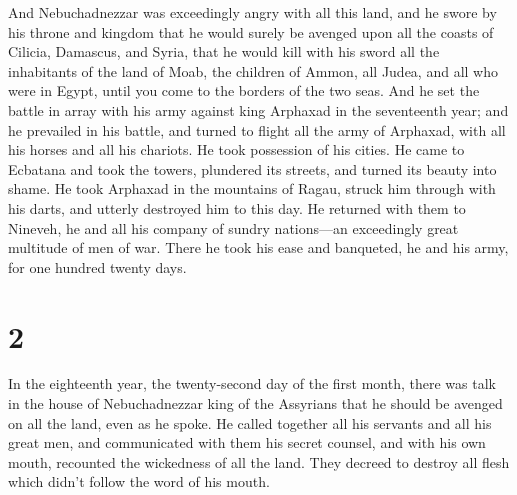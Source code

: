  And Nebuchadnezzar was exceedingly angry with all this
land, and he swore by his throne and kingdom that he would surely be
avenged upon all the coasts of Cilicia, Damascus, and Syria, that he
would kill with his sword all the inhabitants of the land of Moab, the
children of Ammon, all Judea, and all who were in Egypt, until you come
to the borders of the two seas.  And he set the battle in
array with his army against king Arphaxad in the seventeenth year; and
he prevailed in his battle, and turned to flight all the army of
Arphaxad, with all his horses and all his chariots.  He
took possession of his cities. He came to Ecbatana and took the towers,
plundered its streets, and turned its beauty into shame. 
He took Arphaxad in the mountains of Ragau, struck him through with his
darts, and utterly destroyed him to this day.  He
returned with them to Nineveh, he and all his company of sundry
nations---an exceedingly great multitude of men of war. There he took
his ease and banqueted, he and his army, for one hundred twenty days.

\hypertarget{section-1}{%
\section{2}\label{section-1}}

 In the eighteenth year, the twenty-second day of the
first month, there was talk in the house of Nebuchadnezzar king of the
Assyrians that he should be avenged on all the land, even as he spoke.
 He called together all his servants and all his great
men, and communicated with them his secret counsel, and with his own
mouth, recounted the wickedness of all the land.  They
decreed to destroy all flesh which didn't follow the word of his mouth.

